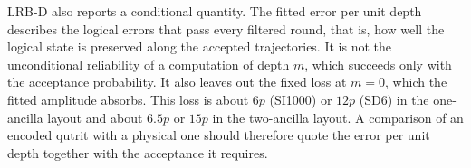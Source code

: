 LRB-D also reports a conditional quantity. The fitted error per unit depth describes the logical errors that pass every filtered round, that is, how well the logical state is preserved along the accepted trajectories. It is not the unconditional reliability of a computation of depth $m$, which succeeds only with the acceptance probability. It also leaves out the fixed loss at $m = 0$, which the fitted amplitude absorbs. This loss is about $6p$ (SI1000) or $12p$ (SD6) in the one-ancilla layout and about $6.5p$ or $15p$ in the two-ancilla layout. A comparison of an encoded qutrit with a physical one should therefore quote the error per unit depth together with the acceptance it requires.
